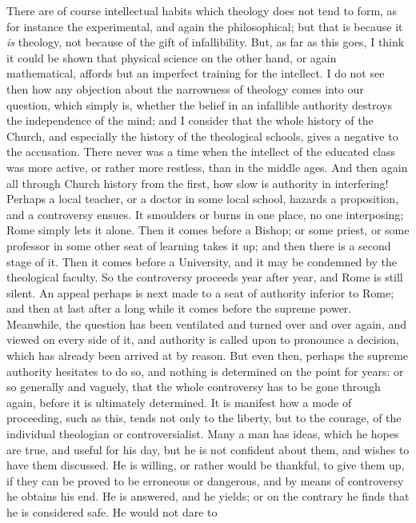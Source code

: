 There are of course intellectual habits which theology does not tend
to form, as for instance the experimental, and again the philosophical;
but that is because it \emph{is} theology, not because of the gift of
infallibility. But, as far as this goes, I think it could be shown that
physical science on the other hand, or again mathematical,
affords but an imperfect training for the intellect. I do not see then
how any objection about the narrowness of theology comes into our
question, which simply is, whether the belief in an infallible
authority destroys the independence of the mind; and I consider that the
whole history of the Church, and especially the history of the
theological schools, gives a negative to the accusation. There never was
a time when the intellect of the educated class was more active, or
rather more restless, than in the middle ages. And then again all
through Church history from the first, how slow is authority in
interfering! Perhaps a local teacher, or a doctor in some local school,
hazards a proposition, and a controversy ensues. It smoulders or burns
in one place, no one interposing; Rome simply lets it alone. Then it
comes before a Bishop; or some priest, or some professor in some other
seat of learning takes it up; and then there is a second stage of it.
Then it comes before a University, and it may be condemned by the
theological faculty. So the controversy proceeds year after year, and
Rome is still silent. An appeal perhaps is next made to a seat of
authority inferior to Rome; and then at last after a long while it comes
before the supreme power. Meanwhile, the question has been ventilated
and turned over and over again, and viewed on every side of it, and authority is called upon to pronounce a decision, which has already
been arrived at by reason. But even then, perhaps the supreme authority
hesitates to do so, and nothing is determined on the point for years: or
so generally and vaguely, that the whole controversy has to be gone
through again, before it is ultimately determined. It is manifest how a
mode of proceeding, such as this, tends not only to the liberty, but to
the courage, of the individual theologian or controversialist. Many a
man has ideas, which he hopes are true, and useful for his day, but he is not confident about them, and wishes to have them discussed.
He is willing, or rather would be thankful, to give them up, if they can
be proved to be erroneous or dangerous, and by means of controversy he
obtains his end. He is answered, and he yields; or on the
contrary he finds that he is considered safe. He would not dare to
